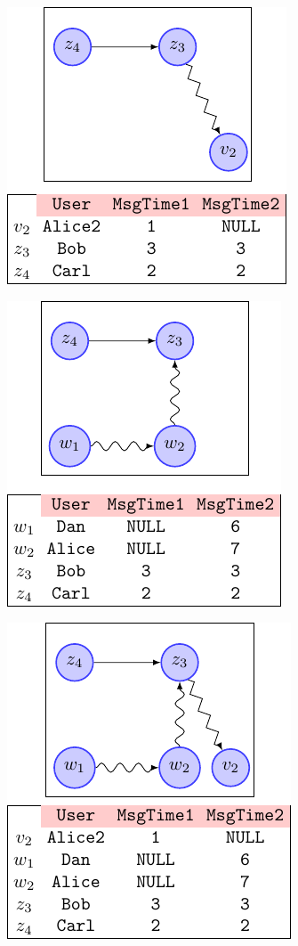 \begin{figure}[!ph]
\begin{minipage}[b]{.3\linewidth}
		\includegraphics[scale=0.8]{fig/03joins/disj_left}
		\label{fig:disj_left}
	\end{minipage}
	\begin{minipage}[b]{.3\linewidth}
		\centering
		\includegraphics[scale=0.8]{fig/03joins/disj_right}
		\label{fig:disj_right}
	\end{minipage}
	\begin{minipage}[b]{.35\linewidth}
		\centering
		\includegraphics[scale=0.8]{fig/03joins/disj_both}

\end{minipage}
\end{figure}
